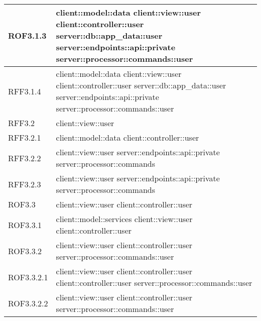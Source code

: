 \begin{center}
\begin{longtable}{| p{4cm} | p{8cm} |}
\hline
ROF3.1.3 & client::model::data \newline client::view::user \newline client::controller::user \newline server::db::app\_data::user \newline server::endpoints::api::private \newline server::processor::commands::user \\
\hline
RFF3.1.4 & client::model::data \newline client::view::user \newline client::controller::user \newline server::db::app\_data::user \newline server::endpoints::api::private \newline server::processor::commands::user \\
\hline
RFF3.2 & client::view::user \\
\hline
RFF3.2.1 & client::model::data \newline client::controller::user \\
\hline
RFF3.2.2 & client::view::user \newline server::endpoints::api::private \newline server::processor::commands \\
\hline
RFF3.2.3 & client::view::user \newline server::endpoints::api::private \newline server::processor::commands \\
\hline
ROF3.3 & client::view::user \newline client::controller::user \\
\hline
ROF3.3.1 & client::model::services \newline client::view::user \newline client::controller::user \\
\hline
ROF3.3.2 & client::view::user \newline client::controller::user \newline server::processor::commands::user \\
\hline
ROF3.3.2.1 & client::view::user \newline client::controller::user \newline client::controller::user \newline server::processor::commands::user \\
\hline
ROF3.3.2.2 & client::view::user \newline client::controller::user \newline server::processor::commands::user \\

\end{longtable}
\end{center}
